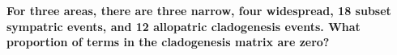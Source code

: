 {\bf {} For three areas, there are three narrow, four widespread, 18 subset sympatric events, and 12 allopatric cladogenesis events. What proportion of terms in the cladogenesis matrix are zero?}




\newpage
